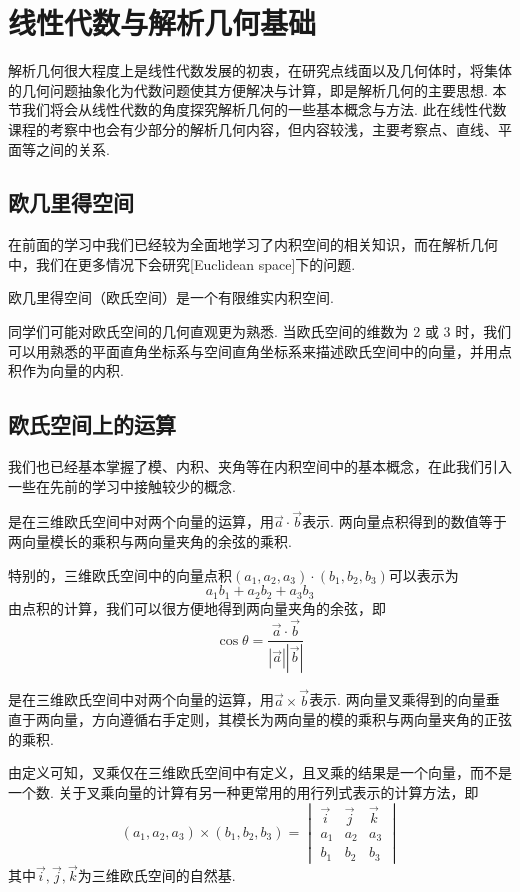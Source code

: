 \chapter{线性代数与解析几何基础}

解析几何很大程度上是线性代数发展的初衷，在研究点线面以及几何体时，将集体的几何问题抽象化为代数问题使其方便解决与计算，即是解析几何的主要思想. 本节我们将会从线性代数的角度探究解析几何的一些基本概念与方法. 此在线性代数课程的考察中也会有少部分的解析几何内容，但内容较浅，主要考察点、直线、平面等之间的关系.

\section{欧几里得空间}

在前面的学习中我们已经较为全面地学习了内积空间的相关知识，而在解析几何中，我们在更多情况下会研究[Euclidean space]下的问题.
\begin{definition}[欧几里得空间]
    欧几里得空间（欧氏空间）是一个有限维实内积空间.
\end{definition}
同学们可能对欧氏空间的几何直观更为熟悉. 当欧氏空间的维数为 2 或 3 时，我们可以用熟悉的平面直角坐标系与空间直角坐标系来描述欧氏空间中的向量，并用点积作为向量的内积.

\section{欧氏空间上的运算}

我们也已经基本掌握了模、内积、夹角等在内积空间中的基本概念，在此我们引入一些在先前的学习中接触较少的概念.
\begin{definition}
    是在三维欧氏空间中对两个向量的运算，用$\vec{a}\cdot\vec{b}$表示. 两向量点积得到的数值等于两向量模长的乘积与两向量夹角的余弦的乘积.
\end{definition}
特别的，三维欧氏空间中的向量点积$(a_1,a_2,a_3)\cdot(b_1,b_2,b_3)$可以表示为\[a_1b_1+a_2b_2+a_3b_3\]
由点积的计算，我们可以很方便地得到两向量夹角的余弦，即\[\cos\theta=\frac{\vec{a}\cdot\vec{b}}{|\vec{a}||\vec{b}|}\]
\begin{definition}
    是在三维欧氏空间中对两个向量的运算，用$\vec{a}\times\vec{b}$表示. 两向量叉乘得到的向量垂直于两向量，方向遵循右手定则，其模长为两向量的模的乘积与两向量夹角的正弦的乘积.
\end{definition}
由定义可知，叉乘仅在三维欧氏空间中有定义，且叉乘的结果是一个向量，而不是一个数. 关于叉乘向量的计算有另一种更常用的用行列式表示的计算方法，即
\[(a_1,a_2,a_3)\times(b_1,b_2,b_3)=\begin{vmatrix}
        \vec{i} & \vec{j} & \vec{k} \\
        a_1     & a_2     & a_3     \\
        b_1     & b_2     & b_3
    \end{vmatrix}\]
其中$\vec{i},\vec{j},\vec{k}$为三维欧氏空间的自然基.

